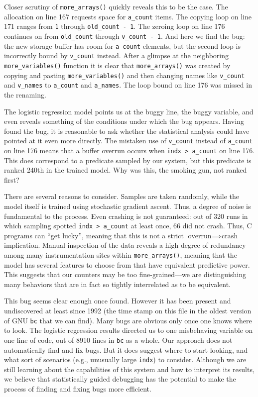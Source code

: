 Closer scrutiny of \texttt{more\_arrays()} quickly reveals this to be
the case.  The allocation on line 167 requests space for
\texttt{a\_count} items.  The copying loop on line 171 ranges from
\texttt{1} through \texttt{old\_count - 1}.  The zeroing loop on line
176 continues on from \texttt{old\_count} through \texttt{v\_count -
  1}.  And here we find the bug: the new storage buffer has room for
\texttt{a\_count} elements, but the second loop is incorrectly bound
by \texttt{v\_count} instead.  After a glimpse at the
neighboring \texttt{more\_variables()} function it is clear that
\texttt{more\_arrays()} was created by copying and pasting
\texttt{more\_variables()} and then changing names like
\texttt{v\_count} and \texttt{v\_names} to \texttt{a\_count} and
\texttt{a\_names}.  The loop bound on line 176 was missed in the
renaming.

The logistic regression model points us at the buggy line, the buggy
variable, and even reveals something of the conditions under which the
bug appears.  Having found the bug, it is reasonable to ask
whether the statistical analysis could have pointed at it even more
directly.  The mistaken use of \texttt{v\_count} instead of
\texttt{a\_count} on line 176 means that a buffer overrun occurs when
\texttt{indx > a\_count} on line 176.  This does correspond to a
predicate sampled by our system, but this predicate is ranked 240th in
the trained model.  Why was this, the smoking gun, not ranked first?

There are several reasons to consider.  Samples are taken randomly,
while the model itself is trained using stochastic gradient ascent.
Thus, a degree of noise is fundamental to the process.  Even crashing
is not guaranteed: out of 320 runs in which sampling spotted
\texttt{indx > a\_count} at least once, 66 did not crash.  Thus, C
programs can ``get lucky'', meaning that this is not a strict
$\text{overrun} \implies \text{crash}$ implication.  Manual inspection
of the data reveals a high degree of redundancy among many
instrumentation sites within \texttt{more\_arrays()}, meaning that the
model has several features to choose from that have equivalent
predictive power.  This suggests that our counters may be too
fine-grained---we are distinguishing many behaviors that are in
fact so tightly interrelated as to be equivalent.  

This bug seems clear enough once found.  However it has been present
and undiscovered at least since 1992 (the time stamp on this file in
the oldest version of GNU \texttt{bc} that we can find).  Many bugs
are obvious only once one knows where to look.  The logistic
regression results directed us to one misbehaving variable on one line
of code, out of 8910 lines in \texttt{bc} as a whole.  Our approach
does not automatically find and fix bugs.  But it does suggest where
to start looking, and what sort of scenarios (e.g., unusually large
\texttt{indx}) to consider.  Although we are still learning about the
capabilities of this system and how to interpret its results, we
believe that statistically guided debugging has the potential to make
the process of finding and fixing bugs more efficient.

